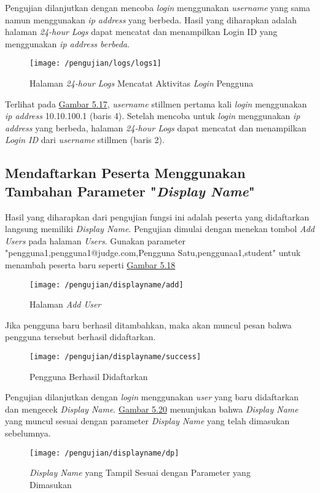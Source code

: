	Pengujian dilanjutkan dengan mencoba \textit{login} menggunakan \textit{username} yang sama namun menggunakan \textit{ip address} yang berbeda. Hasil yang diharapkan adalah halaman \textit{24-hour Logs} dapat mencatat dan menampilkan Login ID yang menggunakan \textit{ip address berbeda}.
	\begin{figure}[H]
		\centering  
		\texttt{[image: /pengujian/logs/logs1]}  
		\caption[Halaman \textit{24-hour Logs} Mencatat Aktivitas \textit{Login} Pengguna]{Halaman \textit{24-hour Logs} Mencatat Aktivitas \textit{Login} Pengguna} 
		\label{fig:logs1} 
	\end{figure}
	Terlihat pada \hyperref[fig:logs1]{Gambar 5.17}, \textit{username} stillmen pertama kali \textit{login} menggunakan \textit{ip address} 10.10.100.1 (baris 4). Setelah mencoba untuk \textit{login} menggunakan \textit{ip address} yang berbeda, halaman \textit{24-hour Logs} dapat mencatat dan menampilkan \textit{Login ID} dari \textit{username} stillmen (baris 2).
	
	\subsection{Mendaftarkan Peserta Menggunakan Tambahan Parameter "\textit{Display Name}"}
	Hasil yang diharapkan dari pengujian fungsi ini adalah peserta yang didaftarkan langsung memiliki \textit{Display Name}. Pengujian dimulai dengan menekan tombol \textit{Add Users} pada halaman \textit{Users}. Gunakan parameter "pengguna1,pengguna1@judge.com,Pengguna Satu,penggunaa1,student" untuk menambah peserta baru seperti \hyperref[fig:useradd]{Gambar 5.18}
	\begin{figure}[H]
		\centering  
		\texttt{[image: /pengujian/displayname/add]}  
		\caption[Halaman \textit{Add User}]{Halaman \textit{Add User}} 
		\label{fig:useradd} 
	\end{figure}

	Jika pengguna baru berhasil ditambahkan, maka akan muncul pesan bahwa pengguna tersebut berhasil didaftarkan.
	\begin{figure}[H]
		\centering  
		\texttt{[image: /pengujian/displayname/success]}  
		\caption[Pengguna Berhasil Didaftarkan]{Pengguna Berhasil Didaftarkan} 
		\label{fig:success} 
	\end{figure}

	Pengujian dilanjutkan dengan \textit{login} menggunakan \textit{user} yang baru didaftarkan dan mengecek \textit{Display Name}. \hyperref[fig:dp]{Gambar 5.20} menunjukan bahwa \textit{Display Name} yang muncul sesuai dengan parameter \textit{Display Name} yang telah dimasukan sebelumnya.
	\begin{figure}[H]
		\centering  
		\texttt{[image: /pengujian/displayname/dp]}  
		\caption[\textit{Display Name} yang Tampil Sesuai dengan Parameter yang Dimasukan]{\textit{Display Name} yang Tampil Sesuai dengan Parameter yang Dimasukan} 
		\label{fig:dp} 
	\end{figure}

